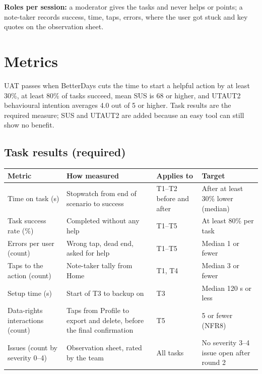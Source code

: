 \documentclass{article}
\begin{document}
\textbf{Roles per session:} a moderator gives the tasks and never helps or points; a note-taker records success, time, taps, errors, where the user got stuck and key quotes on the observation sheet.

\section{Metrics}

UAT passes when BetterDays cuts the time to start a helpful action by at least 30\%, at least 80\% of tasks succeed, mean SUS is 68 or higher, and UTAUT2 behavioural intention averages 4.0 out of 5 or higher. Task results are the required measure; SUS and UTAUT2 are added because an easy tool can still show no benefit.

\subsection{Task results (required)}

\begin{center}
\small
\begin{tabularx}{\linewidth}{|L{3.2cm}|Y|L{2.4cm}|L{4.0cm}|}
\hline
\textbf{Metric} & \textbf{How measured} & \textbf{Applies to} & \textbf{Target} \\ \hline
Time on task (s) & Stopwatch from end of scenario to success & T1--T2 before and after & After at least 30\% lower (median) \\ \hline
Task success rate (\%) & Completed without any help & T1--T5 & At least 80\% per task \\ \hline
Errors per user (count) & Wrong tap, dead end, asked for help & T1--T5 & Median 1 or fewer \\ \hline
Taps to the action (count) & Note-taker tally from Home & T1, T4 & Median 3 or fewer \\ \hline
Setup time (s) & Start of T3 to backup on & T3 & Median 120 s or less \\ \hline
Data-rights interactions (count) & Taps from Profile to export and delete, before the final confirmation & T5 & 5 or fewer (NFR8) \\ \hline
Issues (count by severity 0--4) & Observation sheet, rated by the team & All tasks & No severity 3--4 issue open after round 2 \\ \hline
\end{tabularx}
\end{center}
\end{document}
